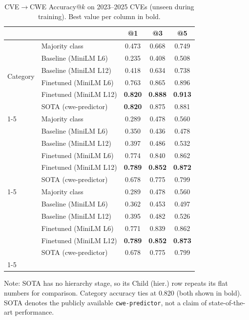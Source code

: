 \documentclass[conference,compsoc]{IEEEtran}
\begin{document}
\begin{table}[t]
\centering
\caption{CVE$\rightarrow$CWE Accuracy@$k$ on 2023--2025 CVEs (unseen during training). Best value per column in bold.}
\label{tab:accuracy}
\begin{tabular}{llccc}
\toprule
 &  & @1 & @3 & @5 \\
\midrule
\multirow[c]{6}{*}{Category} & Majority class & 0.473 & 0.668 & 0.749 \\
 & Baseline (MiniLM L6) & 0.235 & 0.408 & 0.508 \\
 & Baseline (MiniLM L12) & 0.418 & 0.634 & 0.738 \\
 & Finetuned (MiniLM L6) & 0.763 & 0.865 & 0.896 \\
 & Finetuned (MiniLM L12) & \textbf{0.820} & \textbf{0.888} & \textbf{0.913} \\
 & SOTA (cwe-predictor) & \textbf{0.820} & 0.875 & 0.881 \\
\cline{1-5}
\multirow[c]{6}{*}{Child (hier.)} & Majority class & 0.289 & 0.478 & 0.560 \\
 & Baseline (MiniLM L6) & 0.350 & 0.436 & 0.478 \\
 & Baseline (MiniLM L12) & 0.397 & 0.486 & 0.532 \\
 & Finetuned (MiniLM L6) & 0.774 & 0.840 & 0.862 \\
 & Finetuned (MiniLM L12) & \textbf{0.789} & \textbf{0.852} & \textbf{0.872} \\
 & SOTA (cwe-predictor) & 0.678 & 0.775 & 0.799 \\
\cline{1-5}
\multirow[c]{6}{*}{Child (flat)} & Majority class & 0.289 & 0.478 & 0.560 \\
 & Baseline (MiniLM L6) & 0.362 & 0.453 & 0.497 \\
 & Baseline (MiniLM L12) & 0.395 & 0.482 & 0.526 \\
 & Finetuned (MiniLM L6) & 0.771 & 0.839 & 0.862 \\
 & Finetuned (MiniLM L12) & \textbf{0.789} & \textbf{0.852} & \textbf{0.873} \\
 & SOTA (cwe-predictor) & 0.678 & 0.775 & 0.799 \\
\cline{1-5}
\bottomrule
\end{tabular}
\par\smallskip
\begin{minipage}{\columnwidth}
\footnotesize
Note: SOTA has no hierarchy stage, so its Child (hier.) row repeats its flat numbers for comparison. Category accuracy ties at 0.820 (both shown in bold). SOTA denotes the publicly available \texttt{cwe-predictor}, not a claim of state-of-the-art performance.
\end{minipage}
\end{table}
\end{document}

